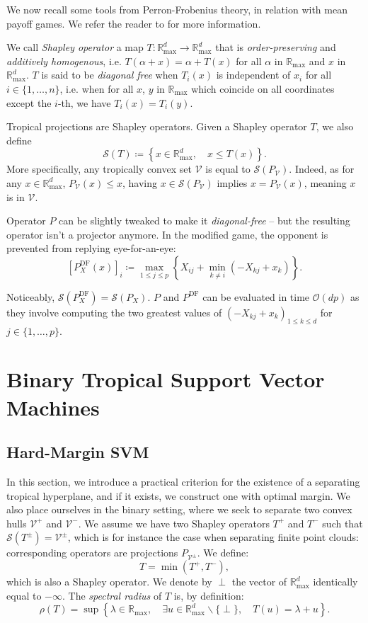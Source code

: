\documentclass[oneside,UKenglish,a4paper]{amsart}
\numberwithin{equation}{section}
\numberwithin{figure}{section}
\theoremstyle{plain}
\theoremstyle{definition}
\theoremstyle{plain}
\theoremstyle{remark}
\theoremstyle{plain}
\theoremstyle{definition}
\theoremstyle{definition}
\begin{document}
We now recall some tools from Perron-Frobenius theory, in relation
with mean payoff games. We refer the reader to \cite{AKIAN2012} for more
information.

We call \emph{Shapley operator} a map $T:\mathbb{R}_{\max}^{d}\rightarrow\mathbb{R}_{\max}^{d}$
that is \emph{order-preserving} and \emph{additively homogenous}, i.e. $T(\alpha+x)=\alpha+T(x)$
for all $\alpha$ in $\mathbb{R}_{\max}$ and $x$ in $\mathbb{R}_{\max}^{d}$. $T$ is said to be \emph{diagonal free} when $T_{i}(x)$
is independent of $x_{i}$ for all $i\in\{1,\ldots, n\}$, i.e. when for all $x$, $y$ in $\mathbb{R}_{\max}$ which coincide on all coordinates except the $i$-th, we have $T_{i}(x)=T_{i}(y)$. 

Tropical projections are Shapley operators. Given a Shapley operator $T$, we also define
\[
\mathcal{S}(T)\coloneqq\left\{x\in\mathbb{R}_{\max}^{d},\quad x\le T(x)\right\}.
\]
More specifically, any tropically convex set $\mathcal{V}$ is equal
to $\mathcal{S}(P_{\mathcal{V}})$. Indeed, as for any $x\in\mathbb{R}_{\text{max}}^{d}$,
$P_{\mathcal{V}}(x)\le x$, having $x\in\mathcal{S}(P_{\mathcal{V}})$
implies $x=P_{\mathcal{V}}(x)$, meaning $x$ is in
$\mathcal{V}$.


Operator $P$ can be slightly tweaked to make it \emph{diagonal-free} -- but the resulting operator isn't a projector anymore.
In the modified game, the opponent is prevented from replying eye-for-an-eye:
\[
\left[P^{\text{DF}}_X(x)\right]_{i}\coloneqq\max_{1\le j\le p}\left\{ X_{ij}+\min_{k\ne i}(-X_{kj}+x_{k})\right\} .
\]

Noticeably, $\mathcal{S}(P_X^\text{DF}) = \mathcal{S}(P_X)$. $P$ and $P^\text{DF}$ can be evaluated in time $\mathcal{O}(dp)$ as they involve computing the two greatest values of $(-X_{kj}+x_k)_{1 \le k \le d}$ for $j\in\{1,\ldots, p\}$.

\section{Binary Tropical Support Vector Machines}

\subsection{Hard-Margin SVM}
In this section, we introduce a practical criterion for the existence of a separating tropical hyperplane, and if it exists, we construct one with optimal margin. We also place ourselves in the binary setting, where we seek to separate two convex hulls $\mathcal{V}^{+}$
and $\mathcal{V}^{-}$. We assume we have two Shapley operators $T^{+}$
and $T^{-}$ such that $\mathcal{S}(T^{\pm})=\mathcal{V}^{\pm}$,
which is for instance the case when separating finite point clouds:
corresponding operators are projections $P_{\mathcal{V}^{\pm}}$. We define:
\[
T=\min(T^{+},T^{-}),
\]
which is also a Shapley operator. We denote by $\perp$ the vector of $\mathbb{R}_{\max}^{d}$
identically equal to $-\infty$. The \emph{spectral radius} of $T$
is, by definition:
\[
\rho(T)=\sup\left\{\lambda\in\mathbb{R}_{\max},\quad\exists u\in\mathbb{R}_{\max}^{d}\backslash\{\perp\},\quad T(u)=\lambda+u\right\}.
\]
\end{document}

